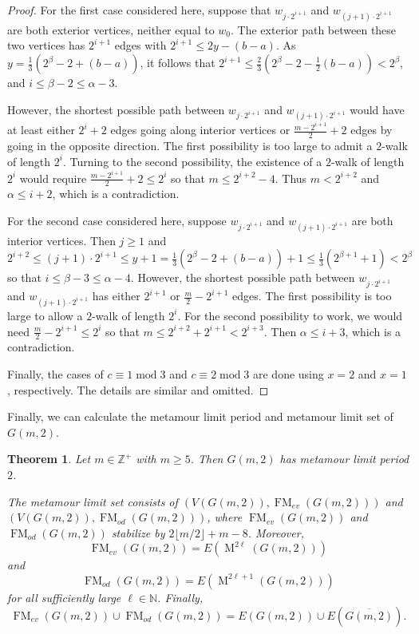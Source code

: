 \documentclass[12pt]{amsart}
\newtheorem{theorem}{Theorem}[section]
\theoremstyle{definition}
\theoremstyle{remark}
\numberwithin{equation}{section}
\numberwithin{figure}{section}
\renewcommand{\mod}{\operatorname{mod}}
\newcommand{\M}{\operatorname{M}}
\newcommand{\FM}{\operatorname{FM}}
\newcommand{\N}{\mathbb{N}}
\newcommand{\Z}{\mathbb{Z}}
\begin{document}
\begin{proof}
    For the first case considered here, suppose that $w_{j\cdot 2^{i+1}}$ and $w_{(j+1)\cdot 2^{i+1}}$ are both exterior vertices, neither equal to $w_0$. 
    The exterior path between these two vertices has $2^{i+1}$ edges with $2^{i+1} \leq 2y-(b-a)$. As $y=\frac{1}{3}(2^\beta-2+(b-a))$, it follows that 
    $2^{i+1} \leq \frac{2}{3}(2^\beta-2-\frac{1}{2}(b-a)) < 2^\beta$, and $i \leq \beta -2 \leq \alpha -3$.
    
    However, the shortest possible path between $w_{j\cdot 2^{i+1}}$ and $w_{(j+1)\cdot 2^{i+1}}$ would have at least either $2^i+2$ edges going along interior vertices or $\frac{m-2^{i+1}}{2}+2$ edges by going in the opposite direction. The first possibility is too large to admit a $2$-walk of length $2^i$. Turning to the second possibility, the existence of a $2$-walk of length $2^i$ would require $\frac{m-2^{i+1}}{2}+2 \leq 2^i$ so that $m \leq 2^{i+2}-4$. Thus $m < 2^{i+2}$ and $\alpha \leq i+2$, which is a contradiction. 

    For the second case considered here, suppose $w_{j\cdot 2^{i+1}}$ and $w_{(j+1)\cdot 2^{i+1}}$ are both interior vertices. 
    Then $j\geq 1$ and $2^{i+2}\leq (j+1)\cdot 2^{i+1} \leq y+1 =  \frac{1}{3}(2^\beta-2+(b-a))+1 \leq \frac{1}{3}(2^{\beta+1}+1) < 2^\beta$ so that $i\leq \beta -3 \leq \alpha -4$. However, the shortest possible path between $w_{j\cdot 2^{i+1}}$ and $w_{(j+1)\cdot 2^{i+1}}$ has either $2^{i+1}$ or $\frac{m}{2}-2^{i+1}$ edges. The first possibility is too large to allow a $2$-walk of length $2^i$. For the second possibility to work, we would need $\frac{m}{2}-2^{i+1}\leq 2^i$ so that $m\leq 2^{i+2}+2^{i+1}<2^{i+3}$. Then $\alpha \leq i+3$, which is a contradiction.
    
    Finally, the cases of $c\equiv 1\mod 3$ and $c\equiv 2\mod 3$ are done using $x=2$ and $x=1$, respectively. The details are similar and omitted.
\end{proof}

Finally, we can calculate the metamour limit period and metamour limit set of $G(m,2)$.
\begin{theorem} \label{thm: Peteresen G(m,2) limit sets}
    Let $m\in\Z^+$ with $m\geq 5$. Then $G(m,2)$ has metamour limit period $2$. 
    
    The metamour limit set consists of $(V(G(m,2)),\FM_{ev}(G(m,2)))$ and $(V(G(m,2)),\FM_{od}(G(m,2)))$, where $\FM_{ev}(G(m,2))$ and $\FM_{od}(G(m,2))$ stabilize by $2 \lfloor m/2 \rfloor +m-8$. Moreover,  
    \[\FM_{ev}(G(m,2)) = E(\M^{2\ell}(G(m,2)))\] and \[\FM_{od}(G(m,2)) = E(\M^{2\ell+1}(G(m,2)))\]
    for all sufficiently large $\ell\in\N$. Finally, 
    \[ \FM_{ev}(G(m,2)) \cup \FM_{od}(G(m,2)) = E(G(m,2)) \cup E(\overline{G(m,2)}). \]
\end{theorem}
\end{document}
